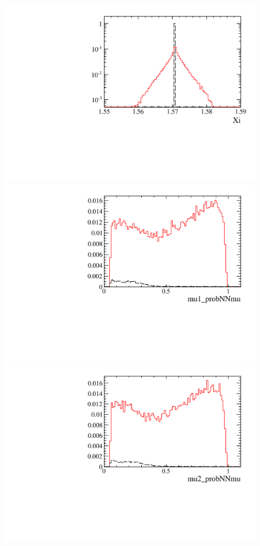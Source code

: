 \begin{figure} [htb!]
\begin{center}
\includegraphics[scale=0.20]{figs/logXiFULL2pipi.pdf}
\includegraphics[scale=0.20]{figs/mu1_probNNmuFULL2pipi.pdf}
\includegraphics[scale=0.20]{figs/mu2_probNNmuFULL2pipi.pdf}

\end{center}
\end{figure}
